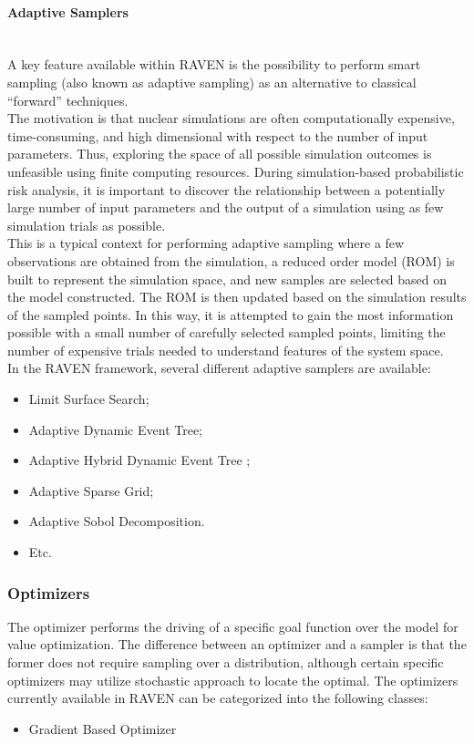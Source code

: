 \paragraph{Adaptive Samplers}~\\
A key feature available within RAVEN is the possibility to perform smart sampling (also known as adaptive sampling) as an 
alternative to classical ``forward'' techniques.
\\The motivation is that nuclear simulations are often computationally expensive, time-consuming, and high dimensional 
with respect to the number of input parameters. Thus, exploring the space of all possible simulation outcomes is unfeasible 
using finite computing resources. During simulation-based probabilistic risk analysis, it is important to discover the 
relationship between a potentially large number of input parameters and the output of a simulation using as few simulation 
trials as possible.
\\This is a typical context for performing adaptive sampling where a few observations are obtained from the simulation, a 
reduced order model (ROM) is built to represent the simulation space, and new samples are selected based on the model 
constructed. The ROM is then updated based on the simulation results of the sampled points. In this way, it is attempted to 
gain the most information possible with a small number of carefully selected sampled points, limiting the number of 
expensive trials needed to understand features of the system space.
\\In the RAVEN framework, several different adaptive samplers are available:
\begin{itemize}
\item Limit Surface Search;
\item Adaptive Dynamic Event Tree;
\item Adaptive Hybrid Dynamic Event Tree ;
\item Adaptive Sparse Grid;
\item Adaptive Sobol Decomposition.
\item Etc.
\end{itemize}


\subsubsection{Optimizers}
The optimizer performs the driving of a specific goal function over the model for value optimization. The difference between 
an optimizer and a sampler is that the former does not require sampling over a distribution, although certain specific 
optimizers may utilize stochastic approach to locate the optimal. The optimizers currently available in RAVEN can be 
categorized into the following classes:
\begin{itemize}
 \item Gradient Based Optimizer
\end{itemize}

